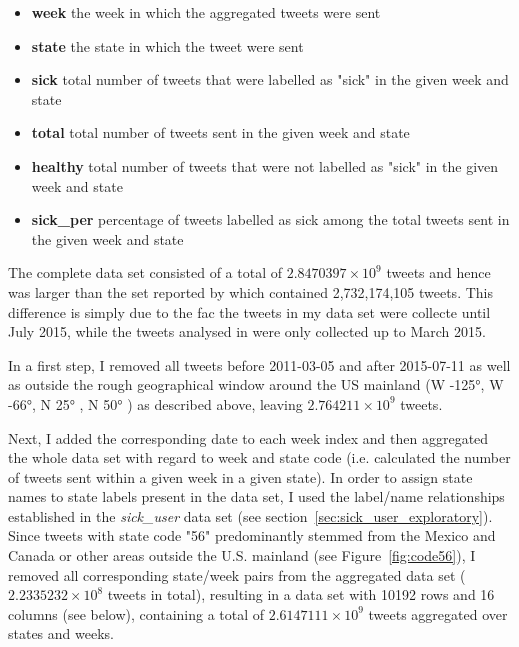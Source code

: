 \documentclass[11pt, a4paper]{report}\usepackage[]{graphicx}\usepackage[]{color}
\begin{document}
\begin{itemize}
  \item \textbf{week} the week in which the aggregated tweets were sent
  \item \textbf{state} the state in which the tweet were sent
  \item \textbf{sick} total number of tweets that were labelled as "sick" in the given week and state
  \item \textbf{total} total number of tweets sent in the given week and state
  \item \textbf{healthy} total number of tweets that were not labelled as "sick" in the given week and state
  \item \textbf{sick\_per} percentage of tweets labelled as sick among the total tweets sent in the given week and state
\end{itemize}


The complete data set consisted of a total of \ensuremath{2.8470397\times 10^{9}} tweets and hence was larger than the set reported by \citep{bodnar_data_2015} which contained 2,732,174,105 tweets. This difference is simply due to the fac the tweets in my data set were collecte until July 2015, while the tweets analysed in \citep{bodnar_data_2015} were only collected up to March 2015.\newline

In a first step, I removed all tweets before 2011-03-05 and after 2015-07-11 as well as outside the rough geographical window around the US mainland (W -125°, W -66°, N 25° , N 50° ) as described above, leaving \ensuremath{2.764211\times 10^{9}} tweets. \newline

Next, I added the corresponding date to each week index and then aggregated the whole data set with regard to week and state code (i.e. calculated the number of tweets sent within a given week in a given state). In order to assign state names to state labels present in the data set, I used the label/name relationships established in the \textit{sick\_user} data set (see section~\ref{sec:sick_user_exploratory}). Since tweets with state code "56" predominantly stemmed from the Mexico and Canada or other areas outside the U.S. mainland (see Figure~\ref{fig:code56}), I removed all corresponding state/week pairs from the aggregated data set (\ensuremath{2.2335232\times 10^{8}} tweets in total), resulting in a data set with 10192 rows and 16 columns (see below), containing a total of \ensuremath{2.6147111\times 10^{9}} tweets aggregated over states and weeks.
\end{document}
